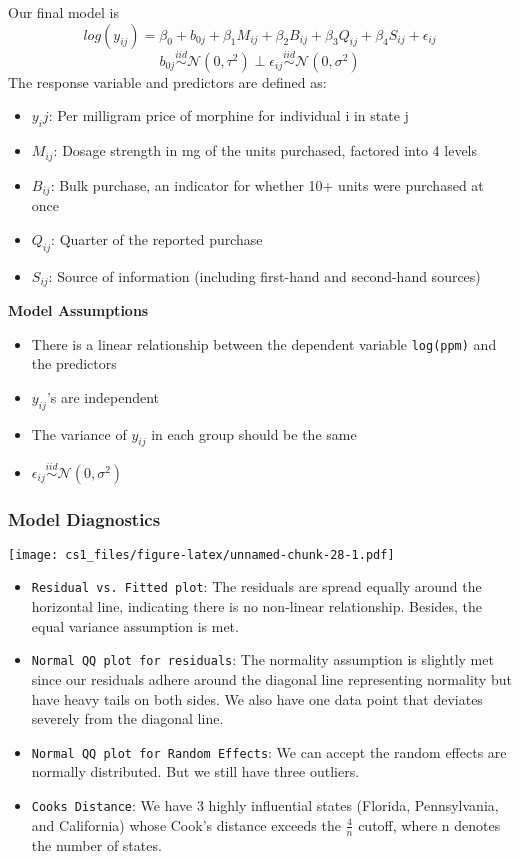 \documentclass[
  11pt,
]{article}
\providecommand{\tightlist}{%
  \setlength{\itemsep}{0pt}\setlength{\parskip}{0pt}}
\begin{document}
Our final model is
\[log(y_{ij}) = \beta_0 + b_{0j} + \beta_1 M_{ij} + \beta_2 B_{ij} + \beta_3 Q_{ij} + \beta_4 S_{ij} + \epsilon_{ij}\]
\[b_{0j} \stackrel{iid}\sim \mathcal{N}(0, \tau^2) \perp \epsilon_{ij} \stackrel{iid} \sim \mathcal{N}(0, \sigma^2)\]
The response variable and predictors are defined as:

\begin{itemize}
\item
  \(y_ij\): Per milligram price of morphine for individual i in state j
\item
  \(M_{ij}\): Dosage strength in mg of the units purchased, factored
  into 4 levels
\item
  \(B_{ij}\): Bulk purchase, an indicator for whether 10+ units were
  purchased at once
\item
  \(Q_{ij}\): Quarter of the reported purchase
\item
  \(S_{ij}\): Source of information (including first-hand and
  second-hand sources)
\end{itemize}

\textbf{Model Assumptions}

\begin{itemize}
\item
  There is a linear relationship between the dependent variable
  \texttt{log(ppm)} and the predictors
\item
  \(y_{ij}\)'s are independent
\item
  The variance of \(y_{ij}\) in each group should be the same
\item
  \(\epsilon_{ij} \stackrel{iid} \sim \mathcal{N}(0, \sigma^2)\)
\end{itemize}

\hypertarget{model-diagnostics}{%
\subsubsection{Model Diagnostics}\label{model-diagnostics}}

\texttt{[image: cs1\_files/figure-latex/unnamed-chunk-28-1.pdf]}

\begin{itemize}
\tightlist
\item
  \texttt{Residual\ vs.\ Fitted\ plot}: The residuals are spread equally
  around the horizontal line, indicating there is no non-linear
  relationship. Besides, the equal variance assumption is met.
\item
  \texttt{Normal\ QQ\ plot\ for\ residuals}: The normality assumption is
  slightly met since our residuals adhere around the diagonal line
  representing normality but have heavy tails on both sides. We also
  have one data point that deviates severely from the diagonal line.
\item
  \texttt{Normal\ QQ\ plot\ for\ Random\ Effects}: We can accept the
  random effects are normally distributed. But we still have three
  outliers.
\item
  \texttt{Cook\textquotesingle{}s\ Distance}: We have 3 highly
  influential states (Florida, Pennsylvania, and California) whose
  Cook's distance exceeds the \(\frac{4}{n}\) cutoff, where n denotes
  the number of states.
\end{itemize}
\end{document}

